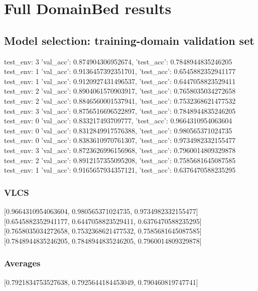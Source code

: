 \documentclass{article}
\begin{document}
\section{Full DomainBed results}

\subsection{Model selection: training-domain validation set}
test_env: 3
{'val_acc': 0.874904306952674, 'test_acc': 0.7848944835246205}
test_env: 1
{'val_acc': 0.9136457392351701, 'test_acc': 0.6545882352941177}
test_env: 1
{'val_acc': 0.9120927431496537, 'test_acc': 0.6447058823529411}
test_env: 2
{'val_acc': 0.8904061570903917, 'test_acc': 0.7658035034272658}
test_env: 2
{'val_acc': 0.8846560001537941, 'test_acc': 0.7532368621477532}
test_env: 3
{'val_acc': 0.8756516696522897, 'test_acc': 0.7848944835246205}
test_env: 0
{'val_acc': 0.833217493709777, 'test_acc': 0.9664310954063604}
test_env: 0
{'val_acc': 0.8312849917576388, 'test_acc': 0.980565371024735}
test_env: 0
{'val_acc': 0.8383610970761307, 'test_acc': 0.9734982332155477}
test_env: 3
{'val_acc': 0.8723626996156968, 'test_acc': 0.7960014809329878}
test_env: 2
{'val_acc': 0.8912157355095208, 'test_acc': 0.7585681645087585}
test_env: 1
{'val_acc': 0.9165657934357121, 'test_acc': 0.6376470588235295}

\subsubsection{VLCS}
[0.9664310954063604, 0.980565371024735, 0.9734982332155477]
[0.6545882352941177, 0.6447058823529411, 0.6376470588235295]
[0.7658035034272658, 0.7532368621477532, 0.7585681645087585]
[0.7848944835246205, 0.7848944835246205, 0.7960014809329878]

\begin{center}
\end{center}

\subsubsection{Averages}
[0.7921834753527638, 0.7925644184453049, 0.790460819747741]

\begin{center}
\end{center}
\end{document}
